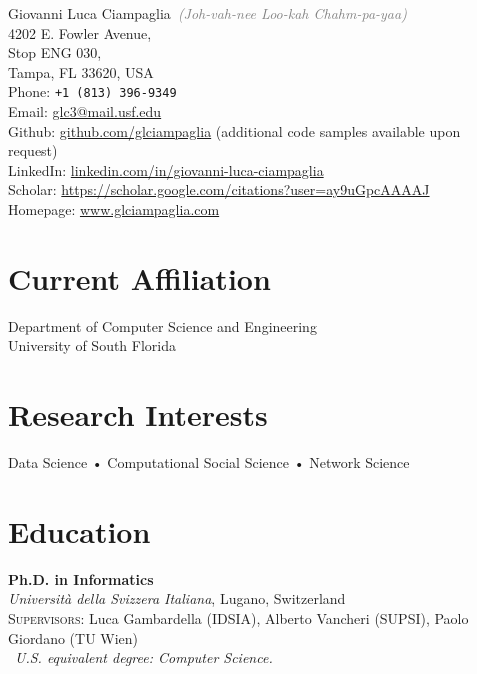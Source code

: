 \documentclass[10pt, letterpaper]{article}
\newcommand{\years}[1]{\marginnote{\small #1}}
\begin{document}
{\LARGE Giovanni Luca Ciampaglia}~\textcolor{gray}{\emph{(Joh-vah-nee Loo-kah Chahm-pa-yaa)}}\\[.75cm]
4202 E. Fowler Avenue,\\
Stop ENG 030, \\
Tampa, FL 33620, USA\\
Phone: \texttt{+1 (813) 396-9349}\\[.2cm]
Email: \href{mailto:glc3@mail.usf.edu}{glc3@mail.usf.edu}\\
Github: \href{http://github.com/glciampaglia}{github.com/glciampaglia} (additional code samples available upon request)\\ 
LinkedIn: \href{http://linkedin.com/in/giovanni-luca-ciampaglia}{linkedin.com/in/giovanni-luca-ciampaglia}\\
Scholar: \href{https://scholar.google.com/citations?user=ay9uGpcAAAAJ}{https://scholar.google.com/citations?user=ay9uGpcAAAAJ}\\
Homepage: \href{http://www.glciampaglia.com/}{www.glciampaglia.com}\\

\section*{Current Affiliation}

Department of Computer Science and Engineering\\
University of South Florida

\section*{Research Interests}
Data Science • Computational Social Science • Network Science


\section*{Education}
\noindent

\years{2012}\textbf{Ph.D. in Informatics\textsuperscript{\textasteriskcentered}}\\
%
\textsl{Università della Svizzera Italiana}, Lugano, Switzerland\\
%
\textsc{Supervisors}: Luca Gambardella (IDSIA), Alberto Vancheri (SUPSI), Paolo
Giordano (TU Wien)\\
\textasteriskcentered~\emph{\footnotesize U.S. equivalent degree: Computer Science.}\\
\end{document}
